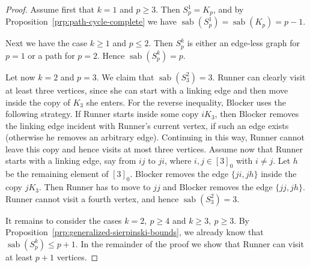 \documentclass[10pt,a4paper]{amsart}
\DeclareMathOperator{\sab}{\mathrm{sab}}
\begin{document}
\begin{proof}
Assume first that $k=1$ and $p\ge 3$. Then $S_p^1=K_p$, and by Proposition~\ref{prp:path-cycle-complete} we have $\sab(S_p^1)=\sab(K_p)=p-1$.

Next we have the case $k \geq 1$ and $p\le 2$. Then $S^k_p$ is either an edge-less graph for $p=1$ or a path for $p=2$. Hence $\sab(S_p^k)=p$.

Let now $k=2$ and $p=3$. We claim that $\sab(S_3^2)=3$. Runner can clearly visit at least three vertices, since she can start with a linking edge and then move inside the copy of $K_3$ she enters. For the reverse inequality, Blocker uses the following strategy. If Runner starts inside some copy $iK_3$, then Blocker removes the linking edge incident with Runner's current vertex, if such an edge exists (otherwise he removes an arbitrary edge). Continuing in this way, Runner cannot leave this copy and hence visits at most three vertices. Assume now that Runner starts with a linking edge, say from $ij$ to $ji$, where $i,j \in [3]_0$ with $i\ne j$. Let $h$ be the remaining element of $[3]_0$. Blocker removes the edge $\{ji,jh\}$ inside the copy $jK_3$. Then Runner has to move to $jj$ and Blocker removes the edge $\{jj,jh\}$. Runner cannot visit a fourth vertex, and hence $\sab(S_3^2)=3$.

It remains to consider the cases $k=2,\ p\ge 4$ and $k\ge 3,\ p\ge 3$. By Proposition~\ref{prp:generalized-sierpinski-bounds}, we already know that $\sab(S_p^k)\le p+1$. In the remainder of the proof we show that Runner can visit at least $p+1$ vertices.


\end{proof}
\end{document}
